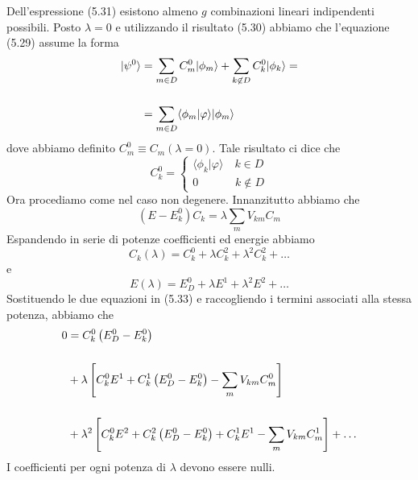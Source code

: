 Dell'espressione (5.31) esistono almeno $g$ combinazioni lineari indipendenti possibili. Posto $\lambda = 0$ e utilizzando il risultato (5.30) abbiamo che l'equazione (5.29) assume la forma 
\begin{align}
	|\psi^0 \rangle & = \sum_{m \in D}C_{m}^0|\phi_m \rangle + \sum_{k \not \in D}C_{k}^0|\phi_k \rangle = \notag \\[0.5cm]
	& =  \sum_{m \in D} \langle \phi_m | \varphi \rangle |\phi_{m} \rangle 
\end{align}
dove abbiamo definito $C_{m}^0 \equiv C_m(\lambda = 0)$. Tale risultato ci dice che 
\begin{equation*}
	C_{k}^0 = \left \{ \begin{array}{l}
		\langle \phi_k|\varphi \rangle \quad k \in D \\[0.3cm]
		0 \quad \quad \quad \; k \not \in D
	\end{array}\right.
\end{equation*}
Ora procediamo come nel caso non degenere. Innanzitutto abbiamo che 
\begin{equation}
	(E - E_k^0) C_k = \lambda \sum_{m} V_{km}C_{m}
\end{equation}
Espandendo in serie di potenze coefficienti ed energie abbiamo 
\begin{equation*}
	C_k(\lambda) = C_k^0 + \lambda C_{k}^2 + \lambda^2 C_{k}^2 + \ldots 
\end{equation*}
 e
 \begin{equation*}
 	E(\lambda) = E_{D}^0 + \lambda E^1 + \lambda^2 E^2 + \ldots 
 \end{equation*}
 Sostituendo le due equazioni in (5.33) e raccogliendo i termini associati alla stessa potenza, abbiamo che 
 \begin{align}
0 & =  C_k^0\left(E_D^0-E_k^0\right) \notag \\[0.5cm]
& +\lambda\left[C_k^0 E^1+C_k^1\left(E_D^0-E_k^0\right)-\sum_m V_{k m} C_m^0\right] \notag \\[0.5cm]
& +\lambda^2\left[C_k^0 E^2+C_k^2\left(E_D^0-E_k^0\right)+C_k^1 E^1-\sum_m V_{k m} C_m^1\right]+\ldots
\end{align}
I coefficienti per ogni potenza di $\lambda$ devono essere nulli. 

